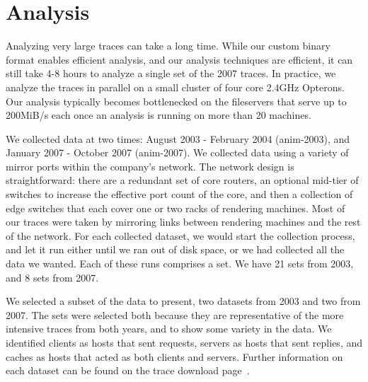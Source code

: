 \section{Analysis}
\label{sec:analysis}





Analyzing very large traces can take a long time.  While our custom
binary format enables efficient analysis, and our analysis techniques
are efficient, it can still take 4-8 hours to analyze a single set of
the 2007 traces.  In practice, we analyze the traces in parallel on a
small cluster of four core 2.4GHz Opterons.  Our analysis typically
becomes bottlenecked on the fileservers that serve up to 200MiB/s each
once an analysis is running on more than 20 machines.

We collected data at two times: August 2003 - February 2004 (anim-2003), and January 2007 - October 2007
(anim-2007).  We collected data using a variety of mirror
ports within the company's network.
The network design is
straightforward: there are a redundant set of core routers, an
optional mid-tier of switches to increase the effective port count of
the core, and then a collection of edge switches that each cover one
or two racks of rendering machines.  Most of our traces were taken by
mirroring links between rendering machines and the rest of the network.
For each collected dataset, we would start the collection
process, and let it run either until we ran out of disk space, or we
had collected all the data we wanted.  Each of these runs comprises a
set.  We have 21 sets from 2003, and 8 sets from 2007. 

We selected a subset of the data to present, two datasets from 2003
and two from 2007.  The sets were selected both because they are
representative of the more intensive traces from both years, and to
show some variety in the data.  We identified clients as hosts that
sent requests, servers as hosts that sent replies, and caches as hosts
that acted as both clients and servers. Further information on each
dataset can be found on the trace download
page~\cite{animation-bear-traces}.

